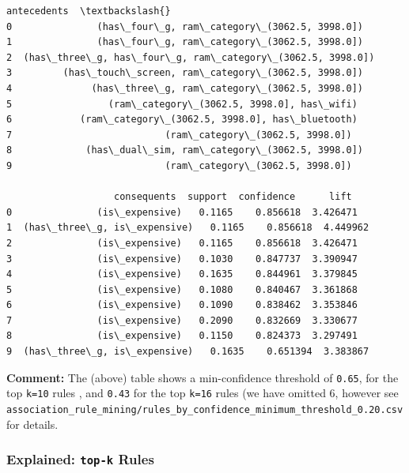 \documentclass[11pt]{article}
\makeatletter
\newcommand{\boxspacing}{\kern\kvtcb@left@rule\kern\kvtcb@boxsep}
\newcommand{\prompt}[4]{
        {\ttfamily\llap{{\color{#2}[#3]:\hspace{3pt}#4}}\vspace{-\baselineskip}}
    }
\makeatother
\begin{document}
            \begin{tcolorbox}[breakable, size=fbox, boxrule=.5pt, pad at break*=1mm, opacityfill=0]
\prompt{Out}{outcolor}{37}{\boxspacing}
\begin{Verbatim}[commandchars=\\\{\}]
                                                antecedents  \textbackslash{}
0               (has\_four\_g, ram\_category\_(3062.5, 3998.0])
1               (has\_four\_g, ram\_category\_(3062.5, 3998.0])
2  (has\_three\_g, has\_four\_g, ram\_category\_(3062.5, 3998.0])
3         (has\_touch\_screen, ram\_category\_(3062.5, 3998.0])
4              (has\_three\_g, ram\_category\_(3062.5, 3998.0])
5                 (ram\_category\_(3062.5, 3998.0], has\_wifi)
6            (ram\_category\_(3062.5, 3998.0], has\_bluetooth)
7                           (ram\_category\_(3062.5, 3998.0])
8             (has\_dual\_sim, ram\_category\_(3062.5, 3998.0])
9                           (ram\_category\_(3062.5, 3998.0])

                   consequents  support  confidence      lift
0               (is\_expensive)   0.1165    0.856618  3.426471
1  (has\_three\_g, is\_expensive)   0.1165    0.856618  4.449962
2               (is\_expensive)   0.1165    0.856618  3.426471
3               (is\_expensive)   0.1030    0.847737  3.390947
4               (is\_expensive)   0.1635    0.844961  3.379845
5               (is\_expensive)   0.1080    0.840467  3.361868
6               (is\_expensive)   0.1090    0.838462  3.353846
7               (is\_expensive)   0.2090    0.832669  3.330677
8               (is\_expensive)   0.1150    0.824373  3.297491
9  (has\_three\_g, is\_expensive)   0.1635    0.651394  3.383867
\end{Verbatim}
\end{tcolorbox}
        
    \textbf{Comment:} The (above) table shows a min-confidence threshold of
\texttt{0.65}, for the top \texttt{k=10} rules , and \texttt{0.43} for
the top \texttt{k=16} rules (we have omitted 6, however see
\texttt{association\_rule\_mining/rules\_by\_confidence\_minimum\_threshold\_0.20.csv}
for details.

    \hypertarget{explained-top-k-rules}{%
\subsubsection{\texorpdfstring{Explained: \texttt{top-k}
Rules}{Explained: top-k Rules}}\label{explained-top-k-rules}}
\end{document}
